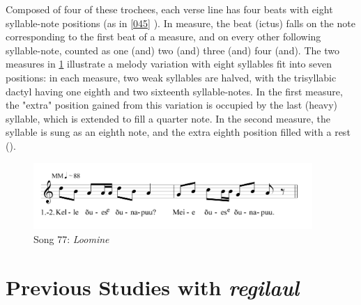 Composed of four of these trochees, each verse line has four beats with eight syllable-note positions (as in  \ref{045} ). In   measure, the beat (ictus) falls on the note corresponding to the first beat of a measure, and on every other following syllable-note, counted as one (and) two (and) three (and) four (and).
The two measures in \ref{077} illustrate a melody variation with eight syllables fit into seven positions: in each measure, two weak syllables are halved, with the trisyllabic dactyl having one eighth and two sixteenth syllable-notes. In the first measure, the "extra" position gained from this variation is occupied by the last (heavy) syllable, which is extended to fill a quarter note. In the second measure, the syllable is sung as an eighth note, and the extra eighth position filled with a rest (\quaverRest). 


\begin{figure}[hb]
\begin{center}
\includegraphics[width=300pt]{figures/077.png}
\caption{Song 77: {\it Loomine}}
\label{077}
\end{center}
\end{figure}





\section{Previous Studies with {\it regilaul}}






%
% 



